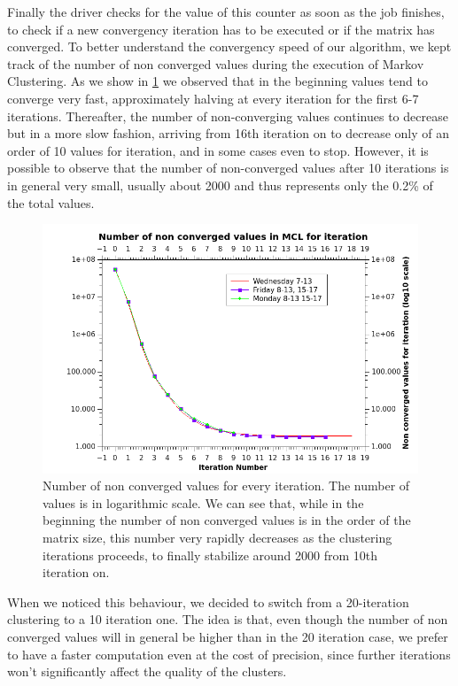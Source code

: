 Finally the driver checks for the value of this counter as soon as the job finishes, to check if a new convergency iteration
has to be executed or if the matrix has converged.
To better understand the convergency speed of our algorithm, we kept track of the number of non converged values during the
execution of Markov Clustering. 
As we show in \ref{fig:convergencyGraph} we observed that in the beginning values tend to converge very fast, approximately halving at every iteration for the first 6-7 iterations. Thereafter, the number of non-converging values continues to decrease
but in a more slow fashion, arriving from 16th iteration on to decrease only of an order of 10 values for iteration, and in some cases even to stop. However, it is possible to observe that the number of non-converged values after 10 iterations is in general very small, usually about 2000 and thus represents only the 0.2\% of the total values.
\begin{figure}[H]
\centering
\includegraphics[scale=0.8]{convergency.png}
\caption{Number of non converged values for every iteration. The number of values is in logarithmic scale. We can see that, while in the beginning the number of non converged values is in the order of the matrix size, this number very rapidly decreases as the clustering iterations proceeds, to finally stabilize around 2000 from 10th iteration on.}
\label{fig:convergencyGraph}
\end{figure}
When we noticed this behaviour, we decided to switch from a 20-iteration clustering to a 10 iteration one. The idea is that, even though the number of non converged values will in general be higher than in the 20 iteration case, we prefer to have a faster computation even at the cost of precision, since further iterations won't significantly affect the quality of the clusters.

